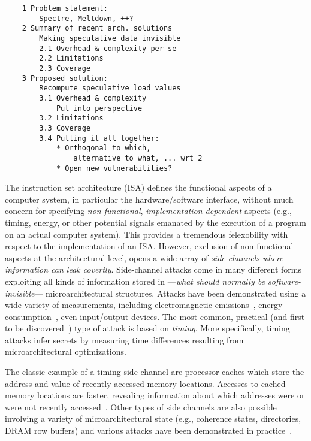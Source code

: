 \begin{verbatim}
    1 Problem statement: 
        Spectre, Meltdown, ++?
    2 Summary of recent arch. solutions
        Making speculative data invisible
        2.1 Overhead & complexity per se
        2.2 Limitations
        2.3 Coverage
    3 Proposed solution: 
        Recompute speculative load values
        3.1 Overhead & complexity 
            Put into perspective
        3.2 Limitations 
        3.3 Coverage
        3.4 Putting it all together:
            * Orthogonal to which, 
                alternative to what, ... wrt 2
            * Open new vulnerabilities?
\end{verbatim}


The instruction set architecture (ISA) defines the functional aspects of a computer system, in particular the hardware/software interface, without much concern for specifying \emph{non-functional}, \emph{implementation-dependent} aspects (e.g., timing, energy, or other potential signals emanated by the execution of a program on an actual computer system). This provides a tremendous felexobility with respect to the implementation of an ISA. However, exclusion of non-functional aspects at the architectural level, opens a wide array of \emph{side channels where information can leak covertly}. Side-channel attacks come in many different forms exploiting all kinds of information stored in ---\emph{what should normally be software-invisible}--- microarchitectural structures. Attacks have been demonstrated using a wide variety of measurements, including electromagnetic emissions~\cite{agrawal2002side}, energy consumption~\cite{kocher1999differential}, even input/output devices\cite{genkin2014rsa,ferrigno2008aes,carmon2017photonic}. The most common, practical (and first to be discovered~\cite{bernstein2005cache}) type of attack is based on \emph{timing}. More specifically, timing attacks infer secrets by measuring time differences resulting from microarchitectural optimizations.

The classic example of a timing side channel are processor caches which store the address and value of recently accessed memory locations. Accesses to cached memory locations are faster, revealing information about which addresses were or were not recently accessed~\cite{yarom_flush+_2014,liu15llc,irazoqui_cross_2016}. Other types of side channels are also possible involving a variety of microarchitectural state (e.g., coherence states, directories, DRAM row buffers) 
and various attacks have been demonstrated in practice~\cite{}.

